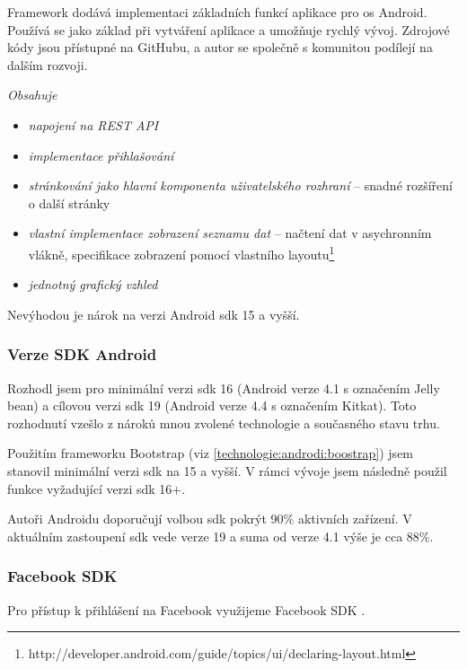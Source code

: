 \documentclass[thesis=B,czech]{FITthesis}[2012/06/26]
\begin{document}
Framework dodává implementaci základních funkcí aplikace pro \acrshort{os} Android. Používá se jako základ při vytváření aplikace a umožňuje rychlý vývoj. Zdrojové kódy jsou přístupné na GitHubu, a autor se společně s komunitou podílejí na dalším rozvoji.\newline

\textit{Obsahuje}
\begin{itemize}[nosep]
	\item \textit{napojení na REST API}
	\item \textit{implementace přihlašování}  
	\item \textit{stránkování jako hlavní komponenta uživatelského rozhraní} -- snadné rozšíření o další stránky
	\item \textit{vlastní implementace zobrazení seznamu dat} -- načtení dat v asychronním vlákně, specifikace zobrazení pomocí vlastního layoutu\footnote{http://developer.android.com/guide/topics/ui/declaring-layout.html}  
	\item \textit{jednotný grafický vzhled}	
\end{itemize}

Nevýhodou je nárok na verzi Android \acrshort{sdk} 15 a vyšší.


\subsubsection {Verze SDK Android}

Rozhodl jsem pro minimální verzi \acrshort{sdk} 16 (Android verze 4.1 s označením Jelly bean) a cílovou verzi \acrshort{sdk} 19 (Android verze 4.4 s označením Kitkat).
Toto rozhodnutí vzešlo z nároků mnou zvolené technologie a současného stavu trhu.

Použitím frameworku Bootstrap (viz \ref{technologie:androdi:boostrap}) jsem stanovil minimální verzi \acrshort{sdk} na 15 a vyšší. V rámci vývoje jsem následně použil funkce vyžadující verzi \acrshort{sdk} 16+.

Autoři Androidu doporučují volbou \acrshort{sdk} pokrýt 90\% aktivních zařízení\cite{android_sdk_recommendation}. V aktuálním zastoupení \acrshort{sdk} vede verze 19 a suma od verze 4.1 výše je cca 88\%\cite{android_sdk_graph}. 

\subsubsection {Facebook SDK}
\label{technology:facebook_sdk}
Pro přístup k přihlášení na Facebook využijeme Facebook SDK \cite{design_facebook_sdk}.
\end{document}
